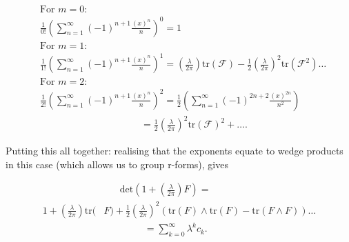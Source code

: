 \documentclass[fleqn, twocolumn, 10pt]{article}
\begin{document}
\begin{ceqn}
\begin{align*}
&\text{For } m = 0\text{:}\\
&\frac{1}{0!}\left(\sum_{n = 1}^{\infty} (-1)^{n+1}\frac{(x)^n}{n}\right)^0 = 1\\
&\text{For } m = 1\text{:}\\
&\frac{1}{1!}\left(\sum_{n = 1}^{\infty} (-1)^{n+1}\frac{(x)^n}{n}\right)^1 = \left(\frac{\lambda}{2\pi}\right)\text{tr}(\mathcal{F}) -  \frac{1}{2}\left(\frac{\lambda}{2\pi}\right)^2\text{tr}(\mathcal{F}^2)\ldots\\
&\text{For } m = 2\text{:}\\
&\frac{1}{2!}\left(\sum_{n = 1}^{\infty} (-1)^{n+1}\frac{(x)^n}{n}\right)^2 = \frac{1}{2}\left(\sum_{n = 1}^{\infty} (-1)^{2n+2}\frac{(x)^{2n}}{n^2}\right)\\
&\;\;\;\;\;\;\;\;\;\;\;\;\;\;\;\;\;\;\;\;\;\;\;\;\;\;\;\;\;\;\;\;\;\;\;\;\;\, = \frac{1}{2}\left(\frac{\lambda}{2\pi}\right)^2\text{tr}(\mathcal{F})^2 +\ldots.
\end{align*}
\end{ceqn} 
Putting this all together: realising that the exponents equate to wedge products in this case (which allows us to group r-forms), gives

\begin{ceqn}
\begin{align*}
&\;\;\;\;\;\;\text{det}\left(1+\left(\frac{\lambda}{2\pi}\right)F\right) 
=\\ 1 + \left(\frac{\lambda}{2\pi}\right)\text{tr}(&F) + \frac{1}{2}\left(\frac{\lambda}{2\pi}\right)^2\left(\text{tr}(F)\land\text{tr}(F)- \text{tr}(F\land F)\right)\ldots\\ 
&\;\;\;\;\;\;\;\;\;\;\;\;\;\;\;= \sum_{k=0}^{\infty}\lambda^kc_k.
\end{align*}
\end{ceqn}

\clearpage


\end{document}
